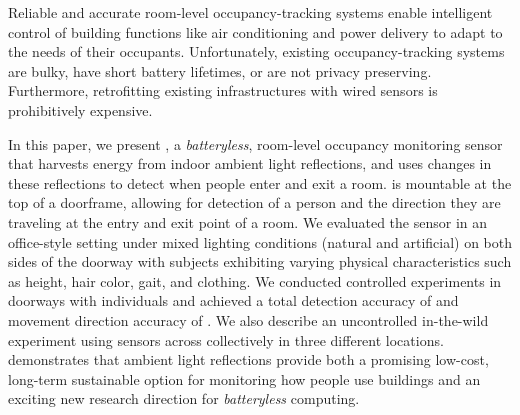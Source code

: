 Reliable and accurate room-level occupancy-tracking systems enable intelligent control of building functions like air conditioning and power delivery to adapt to the needs of their occupants.
Unfortunately, existing occupancy-tracking systems are bulky, have short battery lifetimes, or are not privacy preserving.
Furthermore, retrofitting existing infrastructures with wired sensors is prohibitively expensive.

In this paper, we present \sysname, a \textit{batteryless}, room-level occupancy monitoring sensor that harvests energy from indoor ambient light reflections, and uses changes in these reflections to detect when people enter and exit a room.
\sysname is mountable at the top of a doorframe, allowing for detection of a person and the direction they are traveling at the entry and exit point of a room.
We evaluated the \sysname sensor in an office-style setting under mixed lighting conditions (natural and artificial) on both sides of the doorway with subjects exhibiting varying physical characteristics such as height, hair color, gait, and clothing.
We conducted \numExp controlled experiments in \numDoors doorways with \numPeople individuals and achieved a total detection accuracy of \SysAccuracy and movement direction accuracy of \dirAccuracy.  
We also describe an uncontrolled in-the-wild experiment using \sysname sensors across \ITWdays collectively in three different locations.
\sysname demonstrates that ambient light reflections provide both a promising low-cost, long-term sustainable option for monitoring how people use buildings and an exciting new research direction for \textit{batteryless} computing.
